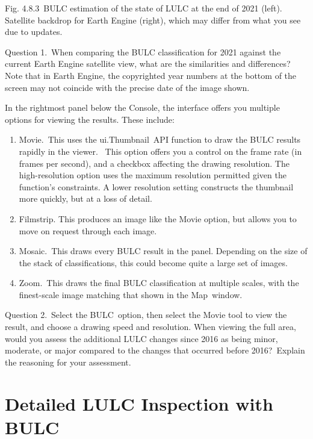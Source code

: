 \documentclass[
  letterpaper,
  DIV=11,
  numbers=noendperiod]{scrreprt}
\providecommand{\tightlist}{%
  \setlength{\itemsep}{0pt}\setlength{\parskip}{0pt}}\usepackage{longtable,booktabs,array}
\begin{document}
Fig. 4.8.3~BULC estimation of the state of LULC at the end of 2021
(left). Satellite backdrop for Earth Engine (right), which may differ
from what you see due to updates. ~

Question 1.~When comparing the BULC classification for 2021 against the
current Earth Engine satellite view, what are the similarities and
differences? Note that in Earth Engine, the copyrighted year numbers at
the bottom of the screen may not coincide with the precise date of the
image shown.

In the rightmost panel below the Console, the interface offers you
multiple options for viewing the results. These include:

\begin{enumerate}
\def\labelenumi{\arabic{enumi}.}
\tightlist
\item
  Movie.~This uses the ui.Thumbnail~API function to draw the BULC
  results rapidly in the viewer. ~This option offers you a control on
  the frame rate (in frames per second), and a checkbox affecting the
  drawing resolution. The high-resolution option uses the maximum
  resolution permitted given the function's constraints. A lower
  resolution setting constructs the thumbnail more quickly, but at a
  loss of detail.
\item
  Filmstrip. This produces an image like the Movie option, but allows
  you to move on request through each image.
\item
  Mosaic.~This draws every BULC result in the panel. Depending on the
  size of the stack of classifications, this could become quite a large
  set of images.
\item
  Zoom.~This draws the final BULC classification at multiple scales,
  with the finest-scale image matching that shown in the Map~window.
\end{enumerate}

Question 2.~Select the BULC~option, then select the Movie tool to view
the result, and choose a drawing speed and resolution. When viewing the
full area, would you assess the additional LULC changes since 2016 as
being minor, moderate, or major compared to the changes that occurred
before 2016?~Explain the reasoning for your assessment.

\hypertarget{detailed-lulc-inspection-with-bulc}{%
\section{Detailed LULC Inspection with
BULC}\label{detailed-lulc-inspection-with-bulc}}
\end{document}
